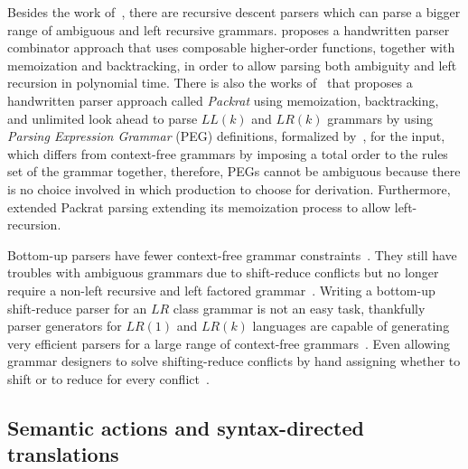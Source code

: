 \documentclass[
  oneside,
  english,
  coorientadorbanca,
  embeddedlogo,
  noabntexcite
]{ufsc-thesis-rn46-2019}
\begin{document}
Besides the work of~\textcite{pratt1973operatorprecedence}, there are recursive descent parsers which can parse a bigger range of ambiguous and left recursive grammars.
\textcite{10.1007/978-3-540-77442-6_12} proposes a handwritten parser combinator approach that uses composable higher-order functions, together with memoization and backtracking, in order to allow parsing both ambiguity and left recursion in polynomial time.
There is also the works of~\textcite{10.1145/583852.581483} that proposes a handwritten parser approach called \textit{Packrat} using memoization, backtracking, and unlimited look ahead to parse $LL(k)$ and $LR(k)$ grammars by using \textit{Parsing Expression Grammar} (PEG) definitions, formalized by~\textcite{10.1145/982962.964011}, for the input, which differs from context-free grammars by imposing a total order to the rules set of the grammar together, therefore, PEGs cannot be ambiguous because there is no choice involved in which production to choose for derivation.
Furthermore, \textcite{10.1145/1328408.1328424} extended Packrat parsing extending its memoization process to allow left-recursion.

Bottom-up parsers have fewer context-free grammar constraints~\cite{Aho:2006:CPT:1177220}.
They still have troubles with ambiguous grammars due to shift-reduce conflicts but no longer require a non-left recursive and left factored grammar~\cite{Aho:2006:CPT:1177220}.
Writing a bottom-up shift-reduce parser for an $LR$ class grammar is not an easy task, thankfully
parser generators for $LR(1)$ and $LR(k)$ languages are capable of generating very efficient parsers for a large range of context-free grammars~\cite{Aho:2006:CPT:1177220}.
Even allowing grammar designers to solve shifting-reduce conflicts by hand assigning whether to shift or to reduce for every conflict~\cite{Aho:2006:CPT:1177220}.

\subsection{Semantic actions and syntax-directed translations}
\end{document}
